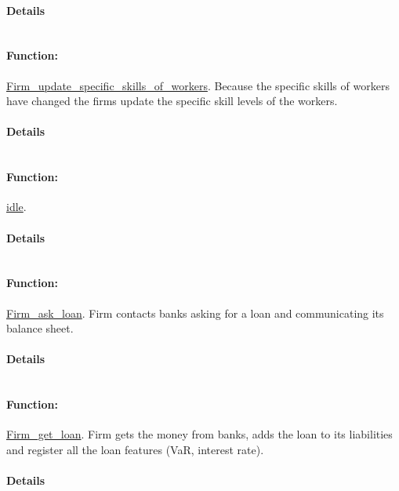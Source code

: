 \documentclass[a4paper,11pt]{article}
\begin{document}
\paragraph{Details}
\begin{verbatim}
\end{verbatim}
\paragraph{Function:}\url{Firm_update_specific_skills_of_workers}.
Because the specific skills of workers have changed the 
firms update the specific skill levels of the workers.
\paragraph{Details}
\begin{verbatim}
\end{verbatim}
\paragraph{Function:}\url{idle}.

\paragraph{Details}
\begin{verbatim}
\end{verbatim}
\paragraph{Function:}\url{Firm_ask_loan}.
Firm contacts banks asking for a loan and communicating its balance sheet.
\paragraph{Details}
\begin{verbatim}
\end{verbatim}
\paragraph{Function:}\url{Firm_get_loan}.
Firm gets the money from banks, adds the loan to its liabilities and register all the loan features (VaR, interest rate).
\paragraph{Details}
\begin{verbatim}
\end{verbatim}
\end{document}
